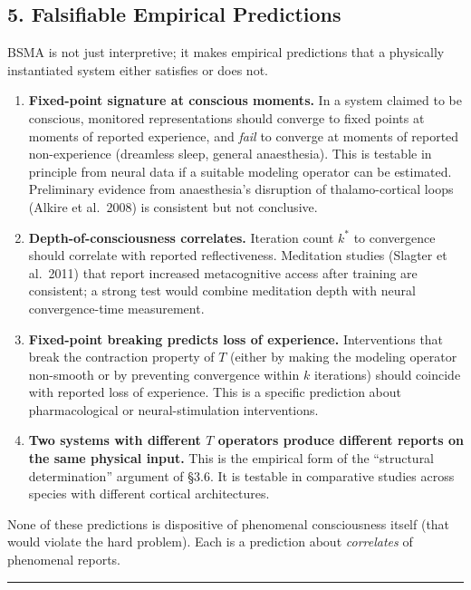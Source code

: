 \documentclass[
  11pt,
  a4paper,
]{article}
\begin{document}
\subsection{5. Falsifiable Empirical
Predictions}\label{falsifiable-empirical-predictions}

BSMA is not just interpretive; it makes empirical predictions that a
physically instantiated system either satisfies or does not.

\begin{enumerate}
\def\labelenumi{\arabic{enumi}.}
\item
  \textbf{Fixed-point signature at conscious moments.} In a system
  claimed to be conscious, monitored representations should converge to
  fixed points at moments of reported experience, and \emph{fail} to
  converge at moments of reported non-experience (dreamless sleep,
  general anaesthesia). This is testable in principle from neural data
  if a suitable modeling operator can be estimated. Preliminary evidence
  from anaesthesia's disruption of thalamo-cortical loops (Alkire et
  al.~2008) is consistent but not conclusive.
\item
  \textbf{Depth-of-consciousness correlates.} Iteration count \(k^*\) to
  convergence should correlate with reported reflectiveness. Meditation
  studies (Slagter et al.~2011) that report increased metacognitive
  access after training are consistent; a strong test would combine
  meditation depth with neural convergence-time measurement.
\item
  \textbf{Fixed-point breaking predicts loss of experience.}
  Interventions that break the contraction property of \(T\) (either by
  making the modeling operator non-smooth or by preventing convergence
  within \(k\) iterations) should coincide with reported loss of
  experience. This is a specific prediction about pharmacological or
  neural-stimulation interventions.
\item
  \textbf{Two systems with different \(T\) operators produce different
  reports on the same physical input.} This is the empirical form of the
  ``structural determination'' argument of §3.6. It is testable in
  comparative studies across species with different cortical
  architectures.
\end{enumerate}

None of these predictions is dispositive of phenomenal consciousness
itself (that would violate the hard problem). Each is a prediction about
\emph{correlates} of phenomenal reports.

\begin{center}\rule{0.5\linewidth}{0.5pt}\end{center}
\end{document}
